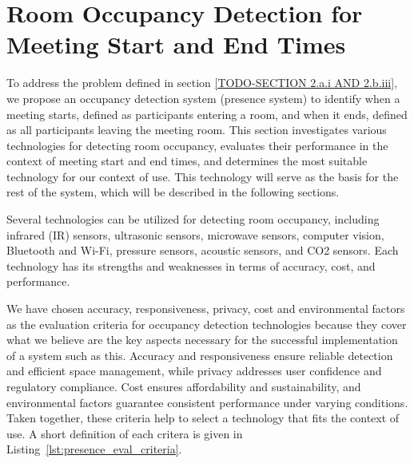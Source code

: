 \section{\label{sec:presence_intro}Room Occupancy Detection for Meeting Start and End Times}

To address the problem defined in section \ref{TODO-SECTION 2.a.i AND 2.b.iii}, we propose an occupancy detection system (presence system) to identify when a meeting starts, defined as participants entering a room, and when it ends, defined as all participants leaving the meeting room.
This section investigates various technologies for detecting room occupancy, evaluates their performance in the context of meeting start and end times, and determines the most suitable technology for our context of use.
This technology will serve as the basis for the rest of the system, which will be described in the following sections.

Several technologies can be utilized for detecting room occupancy, including infrared (IR) sensors\cite{woodward-2021}\cite{dodierBuildingOccupancyDetection2006}\cite{OccupancySensorMotion}, ultrasonic sensors\cite{woodward-2021}\cite{dodierBuildingOccupancyDetection2006}\cite{OccupancySensorMotion}, microwave sensors\cite{woodward-2021}, computer vision\cite{co2sensor}\cite{longoAccurateOccupancyEstimation2019}\cite{OccupancySensorMotion}, Bluetooth and Wi-Fi\cite{teissedre-2019}, pressure sensors\cite{OccupancySensorMotion}, acoustic sensors\cite{OccupancySensorMotion}, and CO2 sensors\cite{co2sensor}\cite{longoAccurateOccupancyEstimation2019}\cite{jinSensingProxyOccupancy2015}.\cite{faragherLocationFingerprintingBluetooth2015}
Each technology has its strengths and weaknesses in terms of accuracy, cost, and performance.

We have chosen accuracy, responsiveness, privacy, cost and environmental factors as the evaluation criteria for occupancy detection technologies because they cover what we believe are the key aspects necessary for the successful implementation of a system such as this.
Accuracy and responsiveness ensure reliable detection and efficient space management, while privacy addresses user confidence and regulatory compliance.
Cost ensures affordability and sustainability, and environmental factors guarantee consistent performance under varying conditions.
Taken together, these criteria help to select a technology that fits the context of use.
A short definition of each critera is given in Listing~\ref{lst:presence_eval_criteria}.

